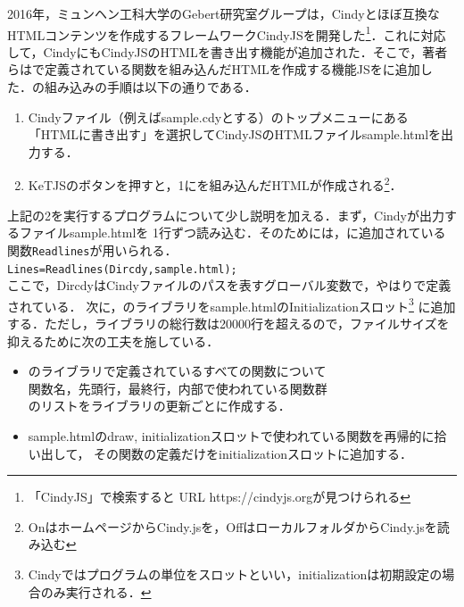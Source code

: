 \documentclass[a4j,12pt]{ujarticle}
\newcounter{Li}
\begin{document}
2016年，ミュンヘン工科大学のGebert研究室グループは，Cindyとほぼ互換なHTMLコンテンツを作成するフレームワークCindyJSを開発した\footnote{「CindyJS」で検索すると URL https://cindyjs.orgが見つけられる}．これに対応して，CindyにもCindyJSのHTMLを書き出す機能が追加された．そこで，著者らは\ketcindy で定義されている関数を組み込んだHTMLを作成する機能\ketcindy JSを\ketcindy に追加した．\ketcindy の組み込みの手順は以下の通りである．\vspace{-2mm}

\begin{enumerate}
\item Cindyファイル（例えばsample.cdyとする）のトップメニューにある「HTMLに書き出す」を選択してCindyJSのHTMLファイルsample.htmlを出力する．\vspace{-2mm}
\item KeTJSのボタンを押すと，1に\ketcindy を組み込んだHTMLが作成される\footnote{OnはホームページからCindy.jsを，OffはローカルフォルダからCindy.jsを読み込む}．\vspace{-1mm}
\end{enumerate}

上記の2を実行するプログラムについて少し説明を加える．まず，Cindyが出力するファイルsample.htmlを
1行ずつ読み込む．そのためには，\ketcindy に追加されている関数\verb|Readlines|が用いられる．\\
\hspace*{2zw}\verb|Lines=Readlines(Dircdy,sample.html);|\\
ここで，DircdyはCindyファイルのパスを表すグローバル変数で，やはり\ketcindy で定義されている．
次に，\ketcindy のライブラリをsample.htmlのInitializationスロット\footnote{Cindyではプログラムの単位をスロットといい，initializationは初期設定の場合のみ実行される．}
に追加する．ただし，ライブラリの総行数は20000行を超えるので，ファイルサイズを抑えるために次の工夫を施している．\vspace{-1mm}
\begin{itemize}
\item  \ketcindy のライブラリで定義されているすべての関数について\\
\hspace*{2zw}関数名，先頭行，最終行，内部で使われている\ketcindy 関数群\\
のリストをライブラリの更新ごとに作成する．\vspace{-2mm}
\item sample.htmlのdraw, initializationスロットで使われている関数を再帰的に拾い出して，
その関数の定義だけをinitializationスロットに追加する．\vspace{-1mm}
\end{itemize}
\end{document}
